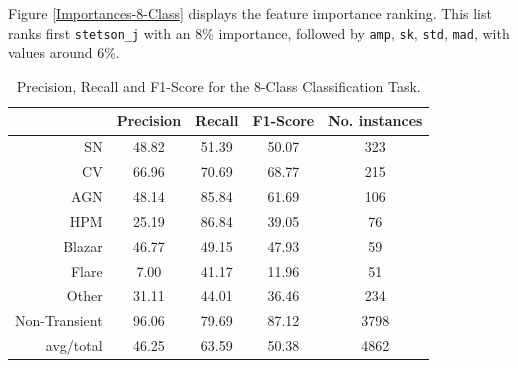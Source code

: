 \documentclass[usenatbib]{mnras}
\begin{document}
Figure \ref{Importances-8-Class} displays the feature importance ranking.
This list ranks first \texttt{stetson\_j} with an 8\% importance,
followed by \texttt{amp}, \texttt{sk}, \texttt{std}, \texttt{mad},
with values around 6\%.   


\begin{table}
\centering
\begin{tabular}{|r|c|c|c|c|}
\hline
\multicolumn{1}{|l|}{} & Precision & Recall & F1-Score & No. instances \\ \hline \hline
SN            &   48.82 &   51.39  &  50.07  &  323 \\ \hline
CV            &   66.96 &   70.69  &  68.77  &  215 \\ \hline
AGN           &   48.14 &   85.84  &  61.69  &  106 \\ \hline
HPM           &   25.19 &   86.84  &  39.05  &   76 \\ \hline
Blazar       &   46.77 &   49.15  &  47.93  &   59 \\ \hline
Flare       &    7.00 &   41.17  &  11.96  &   51 \\ \hline
Other         &   31.11 &   44.01  &  36.46  &  234 \\ \hline
Non-Transient &   96.06 &   79.69  &  87.12  & 3798 \\ \hline
avg/total     &   46.25 &   63.59  &  50.38  & 4862 \\ \hline
\end{tabular}
\caption{Precision, Recall and F1-Score for the 8-Class Classification Task.}
\label{Overall-Scores-8-Class-Regular}
\end{table}
\end{document}
